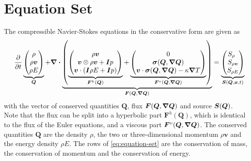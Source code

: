 \documentclass[runningheads]{llncs}
\newcommand{\eqA}{}
\newcommand{\eqB}{(}
\newcommand{\eqMultiA}{(}
\newcommand{\eqMultiB}{)}
\DeclareRobustCommand{\pcrefSingle}[1]{%
\begingroup%
  \renewcommand{\eqA}{(}\renewcommand{\eqB}{}%
\cref{#1}%
\endgroup%
}
\DeclareRobustCommand{\pcrefMulti}[1]{%
\begingroup%
    \renewcommand{\eqMultiA}{}\renewcommand{\eqMultiB}{}%
    (\cref{#1})%
\endgroup%
}
\DeclareRobustCommand{\pcref}[1]{%
\IfSubStr{#1}{,}{\pcrefMulti{#1}}{\pcrefSingle{#1}}%
}
\newcommand{\Q}{\bm{Q}}
\newcommand{\gradQ}{\gradient{\Q}}
\newcommand{\Qrho}{\rho}
\newcommand{\Qj}{\rho \bm{v}}
\newcommand{\Qv}{\bm{v}}
\newcommand{\QE}{\rho E}
\newcommand{\stressT}{\bm{\sigma}}
\newcommand{\pressure}{p}
\newcommand{\flux}{\bm{F}}
\newcommand{\viscFlux}{\flux^{v}}
\newcommand{\hyperFlux}{\flux^{h}}
\newcommand{\source}[1][]{
  \notblank{#1}{
S_{#1}
}{
\bm{S}
}
}
\begin{document}
\section{Equation Set}
\newcommand{\diffCoeff}{\varepsilon}%
\newcommand{\hyperFluxDef}{
  \begin{pmatrix}
    \Qj \\
    \Qv  \otimes \Qj + \bm{I} \pressure  \\
    \Qv \cdot (\bm{I} \QE + \bm{I} \pressure)
  \end{pmatrix}
}%
\newcommand{\viscFluxDef}{
  \begin{pmatrix}
    0\\
     \stressT (\Q, \gradQ)  \\
     \Qv \cdot \stressT (\Q, \gradQ) - \kappa \gradient{T}
   \end{pmatrix}
}%
The compressible Navier-Stokes equations in the conservative form are given as%
\begin{equation}
 \label{eq:equation-set} 
\quad
  \pdv{}{t}
  \underbrace{
  \begin{pmatrix}
    \Qrho\\
    \Qj\\
    \QE
    \end{pmatrix}}_{\Q}
  +
  \divergence{
  \underbrace{
  \left(
   \underbrace{\hyperFluxDef}_{\hyperFlux(\Q)}
+
\underbrace{\viscFluxDef}_{\viscFlux(\Q, \gradQ)}
  \right)}_{\flux(\Q, \gradQ)}}
 =
  \underbrace{
  \begin{pmatrix}
    \source[\Qrho\phantom{\Qrho}]\\
    \source[\Qj]\\
    \source[\QE]
    \end{pmatrix}}_{\source(\Q, \bm{x}, t)}
\end{equation}
with the vector of conserved quantities $\Q$, flux $\flux(\Q, \gradQ)$ and source $\source(\Q)$.
Note that the flux can be split into a hyperbolic part $\hyperFlux(\Q)$,
which is identical to the flux of the Euler equations,
and a viscous part $\viscFlux(\Q, \gradQ)$.
The conserved quantities
\(\Q\)
are the density $\Qrho$, the two or three-dimensional momentum $\Qj$ and the energy density $\QE$.
The rows of \cref{eq:equation-set} are the conservation of mass, the conservation of momentum and the conservation of energy.
\end{document}
